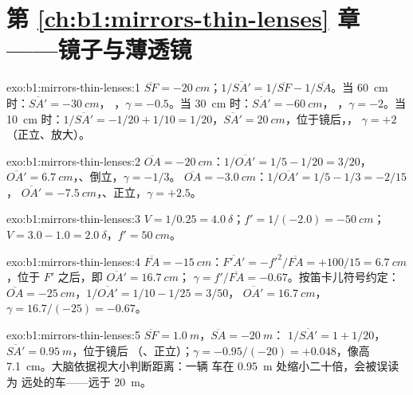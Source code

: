 \section*{第 \ref{ch:b1:mirrors-thin-lenses} 章——镜子与薄透镜}

\begin{solution}{exo:b1:mirrors-thin-lenses:1}
$\overline{SF} = \qty{-20}{cm}$；$1/\overline{SA'} = 1/\overline{SF} -
1/\overline{SA}$。当 \qty{60}{cm} 时：$\overline{SA'} = \qty{-30}{cm}$，
，$\gamma = -0.5$。当 \qty{30}{cm} 时：$\overline{SA'} = \qty{-60}{cm}$，
，$\gamma = -2$。当 \qty{10}{cm} 时：$1/\overline{SA'} = -1/20 + 1/10
= 1/20$，$\overline{SA'} = \qty{+20}{cm}$，位于镜后，，
$\gamma = +2$（正立、放大）。
\end{solution}

\begin{solution}{exo:b1:mirrors-thin-lenses:2}
$\overline{OA} = \qty{-20}{cm}$：$1/\overline{OA'} = 1/5 - 1/20 = 3/20$，
$\overline{OA'} = \qty{+6.7}{cm}$，、倒立，$\gamma = -1/3$。
$\overline{OA} = \qty{-3.0}{cm}$：$1/\overline{OA'} = 1/5 - 1/3 = -2/15$，
$\overline{OA'} = \qty{-7.5}{cm}$，、正立，$\gamma = +2.5$。
\end{solution}

\begin{solution}{exo:b1:mirrors-thin-lenses:3}
$V = 1/0.25 = \qty{+4.0}{\delta}$；$f' = 1/(-2.0) = \qty{-50}{cm}$；
$V = 3.0 - 1.0 = \qty{+2.0}{\delta}$，$f' = \qty{50}{cm}$。
\end{solution}

\begin{solution}{exo:b1:mirrors-thin-lenses:4}
$\overline{FA} = \qty{-15}{cm}$：$\overline{F'A'} = -f'^2/\overline{FA}
= +100/15 = \qty{6.7}{cm}$，位于 $F'$ 之后，即 $\overline{OA'} = \qty{16.7}{cm}$；
$\gamma = f'/\overline{FA} = -0.67$。按笛卡儿符号约定：$\overline{OA} =
\qty{-25}{cm}$，$1/\overline{OA'} = 1/10 - 1/25 = 3/50$，
$\overline{OA'} = \qty{16.7}{cm}$，$\gamma = 16.7/(-25) = -0.67$。
\end{solution}

\begin{solution}{exo:b1:mirrors-thin-lenses:5}
$\overline{SF} = \qty{+1.0}{m}$，$\overline{SA} = \qty{-20}{m}$：
$1/\overline{SA'} = 1 + 1/20$，$\overline{SA'} = \qty{0.95}{m}$，位于镜后
（、正立）；$\gamma = -0.95/(-20) = +0.048$，像高
\qty{7.1}{cm}。大脑依据视大小判断距离：一辆
车在 \qty{0.95}{m} 处缩小二十倍，会被误读为
远处的车——远于 \qty{20}{m}。
\end{solution}

